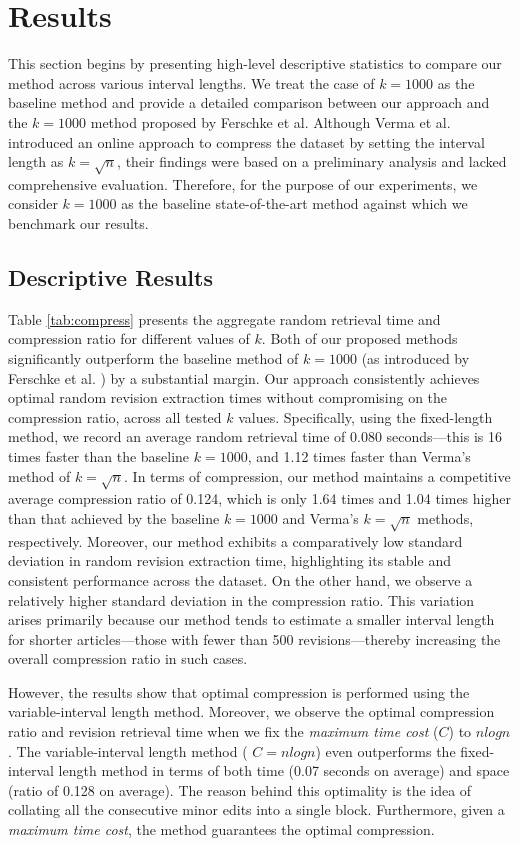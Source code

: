 \documentclass[acmsmall]{acmart}
\begin{document}
\section{Results}
This section begins by presenting high-level descriptive statistics to compare our method across various interval lengths. We treat the case of $k=1000$ as the baseline method and provide a detailed comparison between our approach and the $k=1000$ method proposed by Ferschke et al. Although Verma et al. introduced an online approach to compress the dataset by setting the interval length as $k = \sqrt{n}$, their findings were based on a preliminary analysis and lacked comprehensive evaluation. Therefore, for the purpose of our experiments, we consider $k=1000$ as the baseline state-of-the-art method against which we benchmark our results.


\subsection{Descriptive Results}
Table \ref{tab:compress} presents the aggregate random retrieval time and compression ratio for different values of $k$. Both of our proposed methods significantly outperform the baseline method of $k=1000$ (as introduced by Ferschke et al. \cite{ferschke2011wikipedia}) by a substantial margin. Our approach consistently achieves optimal random revision extraction times without compromising on the compression ratio, across all tested $k$ values. Specifically, using the fixed-length method, we record an average random retrieval time of 0.080 seconds—this is 16 times faster than the baseline $k=1000$, and 1.12 times faster than Verma's method of $k=\sqrt{n}$. In terms of compression, our method maintains a competitive average compression ratio of 0.124, which is only 1.64 times and 1.04 times higher than that achieved by the baseline $k=1000$ and Verma's $k=\sqrt{n}$ methods, respectively. Moreover, our method exhibits a comparatively low standard deviation in random revision extraction time, highlighting its stable and consistent performance across the dataset. On the other hand, we observe a relatively higher standard deviation in the compression ratio. This variation arises primarily because our method tends to estimate a smaller interval length for shorter articles—those with fewer than 500 revisions—thereby increasing the overall compression ratio in such cases. 

However, the results show that optimal compression is performed using the variable-interval length method. Moreover, we observe the optimal compression ratio and revision retrieval time when we fix the \emph{maximum time cost} ($C$) to $nlogn$. The variable-interval length method ( $C = nlogn$) even outperforms the fixed-interval length method in terms of both time (0.07 seconds on average) and space (ratio of 0.128 on average). The reason behind this optimality is the idea of collating all the consecutive minor edits into a single block. Furthermore, given a \emph{maximum time cost}, the method guarantees the optimal compression.
\end{document}
